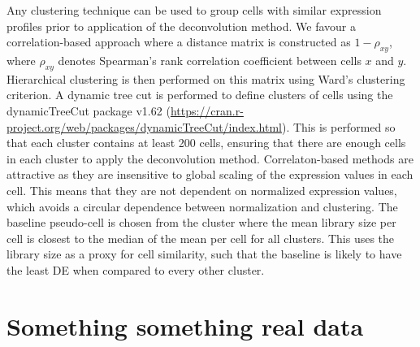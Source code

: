 \documentclass{article}
\begin{document}
Any clustering technique can be used to group cells with similar expression profiles prior to application of the deconvolution method.
We favour a correlation-based approach where a distance matrix is constructed as $1-\rho_{xy}$,
    where $\rho_{xy}$ denotes Spearman's rank correlation coefficient between cells $x$ and $y$.
Hierarchical clustering is then performed on this matrix using Ward's clustering criterion.
A dynamic tree cut is performed to define clusters of cells using the dynamicTreeCut package v1.62 (\url{https://cran.r-project.org/web/packages/dynamicTreeCut/index.html}).
This is performed so that each cluster contains at least 200 cells, ensuring that there are enough cells in each cluster to apply the deconvolution method.
Correlaton-based methods are attractive as they are insensitive to global scaling of the expression values in each cell.
This means that they are not dependent on normalized expression values, which avoids a circular dependence between normalization and clustering.
The baseline pseudo-cell is chosen from the cluster where the mean library size per cell is closest to the median of the mean per cell for all clusters.
This uses the library size as a proxy for cell similarity, such that the baseline is likely to have the least DE when compared to every other cluster.

\section{Something something real data}



\end{document}
